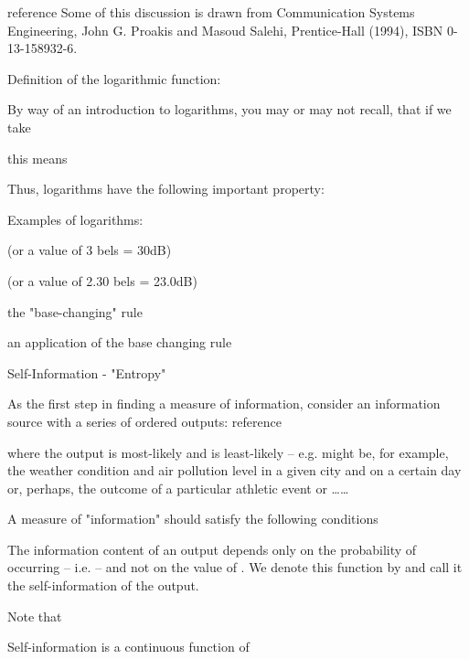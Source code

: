 \begin{frame}
reference 
Some of this discussion is drawn from Communication Systems Engineering, John G. Proakis and Masoud Salehi, Prentice-Hall (1994), ISBN 0-13-158932-6.

Definition of the logarithmic function:

By way of an introduction to logarithms, you may or may not recall, that if we take


this means
 
Thus, logarithms have the following important property:


\end{frame}
\begin{frame}  
  
 Examples of logarithms:
 

 
 
(or a value of 3 bels = 30dB)
 
 
(or a value of 2.30 bels = 23.0dB)
 
 
the "base-changing" rule
 
 
 
an application of the base changing rule



Self-Information - "Entropy"

 
As the first step in finding a measure of information, consider an information source with a series of ordered outputs: reference


where the output  is    most-likely and    is least-likely -- e.g.   might be, for example, the weather condition and air pollution level in a given city and on a certain day or, perhaps, the outcome of a particular athletic event or …… 
  
 
A measure of "information" should satisfy the following conditions

 
The information content of an output  depends only on the probability of   occurring  -- i.e. --  and not on the value of  .  We denote this function by  and call it the self-information of the output.
                      
                  Note that   
 
Self-information is a continuous function of 


\end{frame}
